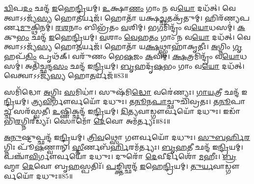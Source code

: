 \-\ul{𑌦𑍍𑌵𑌿}\-𑌪\-\ul{𑌦𑌂} 𑌛𑌨𑍍𑌦᳴ \ul{𑌇}\-𑌹𑍇\-\ul{𑌨𑍍𑌦𑍍𑌰𑌿}\-𑌯𑌮𑍍।
\-\ul{𑌉}\-𑌕𑍍𑌷𑌾\-\ul{𑌣𑌂} 𑌗𑌾𑌂 𑌨 𑌵\-\ul{𑌯𑍋} 𑌦𑌧᳴𑌤𑍍।
𑌵𑍇𑌤𑍍𑌵𑌾𑌽𑌽𑌜𑍍𑌯᳴\-\ul{𑌸𑍍𑌯} 𑌹𑍋\-\ul{𑌤}\-𑌰𑍍𑌯𑌜᳴।
𑌹𑍋𑌤𑌾᳴ 𑌯𑌕𑍍𑌷\-\ul{𑌚𑍍𑌛}\-𑌤𑌕𑍍𑌰᳴𑌤𑍁𑌮𑍍।
𑌹𑌿𑌰᳴𑌣𑍍𑌯\-𑌪𑌰𑍍𑌣\-\ul{𑌮𑍁}\-𑌕𑍍𑌥𑌿𑌨𑌮𑍍॑।
\-\ul{𑌰}\-\-\ul{𑌶}\-𑌨𑌾𑌂 𑌬𑌿𑌭𑍍𑌰᳴𑌤𑌂 \ul{𑌵}\-𑌶𑌿𑌮𑍍।
𑌭\-\ul{𑌗}\-𑌮𑌿𑌨𑍍𑌦𑍍𑌰𑌂᳴ 𑌵\-\ul{𑌯𑍋}\-𑌧𑌸𑌮𑍍॑।
\-\ul{𑌕}\-𑌕𑍁\-\ul{𑌭𑌂} 𑌛𑌨𑍍𑌦᳴ \ul{𑌇}\-𑌹𑍇\-\ul{𑌨𑍍𑌦𑍍𑌰𑌿}\-𑌯𑌮𑍍।
\-\ul{𑌵}\-𑌶𑌾𑌂 \ul{𑌵𑍇}\-𑌹\-\ul{𑌤𑌂} 𑌗𑌾𑌂 𑌨 𑌵\-\ul{𑌯𑍋} 𑌦𑌧᳴𑌤𑍍।
𑌵𑍇𑌤𑍍𑌵𑌾𑌽𑌽𑌜𑍍𑌯᳴\-\ul{𑌸𑍍𑌯} 𑌹𑍋\-\ul{𑌤}\-𑌰𑍍𑌯𑌜᳴।
𑌹𑍋𑌤𑌾᳴ 𑌯\-\ul{𑌕𑍍𑌷}\-𑌥𑍍𑌸𑍍𑌵𑌾𑌹𑌾᳴𑌕𑍃𑌤𑍀𑌃।
\-\ul{𑌅}\-𑌗𑍍𑌨𑌿𑌂 \ul{𑌗𑍃}\-𑌹𑌪᳴\-\ul{𑌤𑌿𑌂} 𑌪𑍃𑌥᳴𑌕𑍍।
𑌵𑌰𑍁᳴𑌣𑌂 𑌭𑍇\-\ul{𑌷}\-𑌜𑌂 \ul{𑌕}\-𑌵𑌿𑌮𑍍।
\-\ul{𑌕𑍍𑌷}\-𑌤𑍍𑌰𑌮𑌿𑌨𑍍𑌦𑍍𑌰𑌂᳴ 𑌵\-\ul{𑌯𑍋}\-𑌧𑌸𑌮𑍍॑।
𑌅𑌤𑌿᳴𑌚𑍍𑌛𑌨𑍍𑌦\-\ul{𑌸𑌂} 𑌛𑌨𑍍𑌦᳴ 𑌇\-\ul{𑌨𑍍𑌦𑍍𑌰𑌿}\-𑌯𑌮𑍍।
\-\ul{𑌬𑍃}\-𑌹𑌦𑍃᳴\-\ul{𑌷}\-𑌭𑌂 𑌗𑌾𑌂 𑌵\-\ul{𑌯𑍋} 𑌦𑌧᳴𑌤𑍍।
𑌵𑍇𑌤𑍍𑌵𑌾𑌽𑌽𑌜𑍍𑌯᳴\-\ul{𑌸𑍍𑌯} 𑌹𑍋\-\ul{𑌤}\-𑌰𑍍𑌯𑌜᳴॥83॥

𑌸𑌮𑌿᳴𑌦𑍍𑌧𑍋 \ul{𑌅}\-𑌗𑍍𑌨𑌿𑌃 \ul{𑌸}\-𑌮𑌿𑌧𑌾॑।
𑌸𑍁𑌷᳴𑌮𑌿\-\ul{𑌦𑍍𑌧𑍋} 𑌵𑌰𑍇॑𑌣𑍍𑌯𑌃।
\-\ul{𑌗𑌾}\-\-\ul{𑌯}\-𑌤𑍍𑌰𑍀 𑌛𑌨𑍍𑌦᳴ 𑌇\-\ul{𑌨𑍍𑌦𑍍𑌰𑌿}\-𑌯𑌮𑍍।
𑌤𑍍𑌰𑍍𑌯\-\ul{𑌵𑌿}\-𑌰𑍍𑌗𑍗𑌰𑍍𑌵𑌯𑍋᳴ 𑌦𑌧𑍁𑌃।
𑌤\-\ul{𑌨𑍂}\-𑌨\-\ul{𑌪𑌾}\-𑌚𑍍𑌛𑍁𑌚𑌿᳴𑌵𑍍𑌰𑌤𑌃।
\-\ul{𑌤}\-\-\ul{𑌨𑍂}\-𑌪𑌾\-\ul{𑌚𑍍𑌚} 𑌸𑌰᳴𑌸𑍍𑌵𑌤𑍀।
\-\ul{𑌉}\-𑌷𑍍𑌣𑌿𑌕𑍍𑌛𑌨𑍍𑌦᳴ 𑌇\-\ul{𑌨𑍍𑌦𑍍𑌰𑌿}\-𑌯𑌮𑍍।
\-\ul{𑌦𑌿}\-\-\ul{𑌤𑍍𑌯}\-𑌵𑌾𑌡𑍍𑌗𑍗𑌰𑍍𑌵𑌯𑍋᳴ 𑌦𑌧𑍁𑌃।
𑌇𑌡𑌾᳴𑌭𑌿\-\ul{𑌰}\-𑌗𑍍𑌨𑌿𑌰𑍀𑌡𑍍𑌯𑌃᳴।
𑌸𑍋𑌮𑍋᳴ \ul{𑌦𑍇}\-𑌵𑍋 𑌅𑌮᳴𑌰𑍍𑌤𑍍𑌯𑌃॥84॥

\-\ul{𑌅}\-\-\ul{𑌨𑍁}\-𑌷𑍍𑌟𑍁𑌪𑍍𑌛𑌨𑍍𑌦᳴ 𑌇\-\ul{𑌨𑍍𑌦𑍍𑌰𑌿}\-𑌯𑌮𑍍।
\-\ul{𑌤𑍍𑌰𑌿}\-\-\ul{𑌵}\-𑌥𑍍𑌸𑍋 𑌗𑍗𑌰𑍍𑌵𑌯𑍋᳴ 𑌦𑌧𑍁𑌃।
\-\ul{𑌸𑍁}\-\-\ul{𑌬}\-\-\ul{𑌰𑍍}\-𑌹𑌿\-\ul{𑌰}\-𑌗𑍍𑌨𑌿𑌃 𑌪𑍂᳴\-\ul{𑌷}\-𑌣𑍍𑌵𑌾𑌨𑍍।
\-\ul{𑌸𑍍𑌤𑍀}\-𑌰𑍍𑌣𑌬᳴\-\ul{𑌰𑍍𑌹𑌿}\-𑌰𑌮᳴𑌰𑍍𑌤𑍍𑌯𑌃।
\-\ul{𑌬𑍃}\-\-\ul{𑌹}\-𑌤𑍀 𑌛𑌨𑍍𑌦᳴ 𑌇\-\ul{𑌨𑍍𑌦𑍍𑌰𑌿}\-𑌯𑌮𑍍।
𑌪𑌞𑍍𑌚𑌾᳴\-\ul{𑌵𑌿}\-𑌰𑍍𑌗𑍗𑌰𑍍𑌵𑌯𑍋᳴ 𑌦𑌧𑍁𑌃।
𑌦𑍁𑌰𑍋᳴ \ul{𑌦𑍇}\-𑌵𑍀𑌰𑍍𑌦𑌿𑌶𑍋᳴ \ul{𑌮}\-𑌹𑍀𑌃।
\-\ul{𑌬𑍍𑌰}\-𑌹𑍍𑌮𑌾 \ul{𑌦𑍇}\-𑌵𑍋 𑌬𑍃\-\ul{𑌹}\-𑌸𑍍𑌪𑌤𑌿𑌃᳴।
\-\ul{𑌪}\-𑌙𑍍𑌕𑍍𑌤𑌿𑌶𑍍𑌛𑌨𑍍𑌦᳴ \ul{𑌇}\-𑌹𑍇\-\ul{𑌨𑍍𑌦𑍍𑌰𑌿}\-𑌯𑌮𑍍।
\-\ul{𑌤𑍁}\-\-\ul{𑌰𑍍𑌯}\-𑌵𑌾𑌡𑍍𑌗𑍗𑌰𑍍𑌵𑌯𑍋᳴ 𑌦𑌧𑍁𑌃॥85॥

